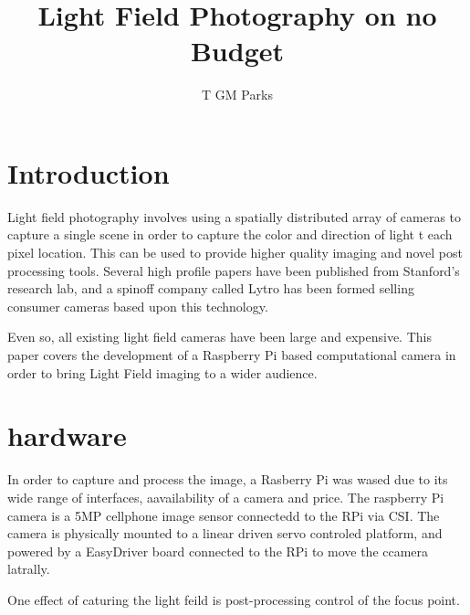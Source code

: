 \documentclass[11pt]{amsart}
\title{Light Field Photography on no Budget}
\author{T GM Parks}
\begin{document}
\begin{abstract}
\end{abstract}

\maketitle

\section{Introduction}
Light field photography involves using a spatially distributed array of cameras to capture a single scene in order to capture the color and direction of light t each pixel location. This can be used to provide higher quality imaging and novel post processing tools. Several high profile papers have been published from Stanford's research lab, and a spinoff company called Lytro has been formed selling consumer cameras based upon this technology.

Even so, all existing light field cameras have been large and expensive. This paper covers the development of a Raspberry Pi based computational camera in order to bring Light Field imaging to a wider audience. 

\section{hardware}

In order to capture and process the image, a Rasberry Pi was wased due to its wide range of interfaces, aavailability of a camera and price. The raspberry Pi camera is a 5MP cellphone image sensor connectedd to the RPi via CSI. The camera is physically mounted to a linear driven servo controled platform, and powered by a EasyDriver board connected to the RPi to move the ccamera latrally.

One effect of caturing the light feild is post-processing control of the focus point.
\end{document}
